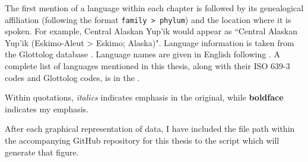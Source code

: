 The first mention of a language within each chapter is followed by its genealogical affiliation (following the format \texttt{family > phylum}) and the location where it is spoken. For example, Central Alaskan Yup'ik would appear as ``Central Alaskan Yup'ik (Eskimo-Aleut > Eskimo; Alaska)". Language information is taken from the Glottolog database \citep{HammarstromForkelHaspelmath2019}. Language names are given in English following \citet{Haspelmath2017}. A complete list of languages mentioned in this thesis, along with their ISO 639-3 codes and Glottolog codes, is in the .

Within quotations, \textit{italics} indicates emphasis in the original, while \textbf{boldface} indicates my emphasis.


After each graphical representation of data, I have included the file path within the accompanying GitHub repository for this thesis to the script which will generate that figure.
